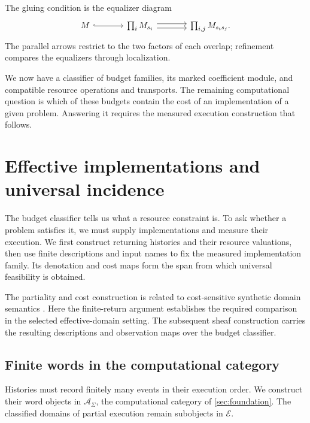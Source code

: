 \documentclass[11pt,a4paper]{article}
\numberwithin{algorithm}{section}
\numberwithin{equation}{section}
\theoremstyle{definition}
\theoremstyle{remark}
\theoremstyle{plain}
\newcommand{\E}{\mathcal E}
\newcommand{\AS}{\mathcal A_{\Sigma}}
\theoremstyle{definition}
\theoremstyle{plain}
\begin{document}
The gluing condition is the equalizer diagram
\[
\begin{tikzcd}[column sep=large]
 M \arrow[r,hook]
   & {\prod_iM_{s_i}}
       \arrow[r,shift left=.6ex]
       \arrow[r,shift right=.6ex]
   & {\prod_{i,j}M_{s_is_j}} .
\end{tikzcd}
\]
The parallel arrows restrict to the two factors of each overlap;
refinement compares the equalizers through localization.

We now have a classifier of budget families, its marked coefficient
module, and compatible resource operations and transports. The
remaining computational question is which of these budgets contain
the cost of an implementation of a given problem. Answering it
requires the measured execution construction that follows.


\section{Effective implementations and universal incidence}
\label{sec:measurements}
The budget classifier tells us what a resource constraint is. To ask
whether a problem satisfies it, we must supply implementations and
measure their execution. We first construct returning histories and
their resource valuations, then use finite descriptions and input names
to fix the measured implementation family. Its denotation and cost maps
form the span from which universal feasibility is obtained.

The partiality and cost construction is related to cost-sensitive
synthetic domain semantics \citep{NiuSterlingHarper2024CostSensitiveSDT}.
Here the finite-return argument establishes the required comparison in
the selected effective-domain setting. The subsequent sheaf
construction carries the resulting descriptions and observation maps
over the budget classifier.


\subsection{Finite words in the computational category}
Histories must record finitely many events in their execution order.
We construct their word objects in $\AS$, the computational category
of \cref{sec:foundation}. The classified domains of partial execution
remain subobjects in $\E$.
\end{document}
